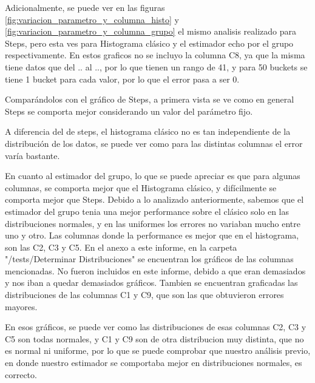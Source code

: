 Adicionalmente, se puede ver en las figuras \ref{fig:variacion_parametro_y_columna_histo} y \ref{fig:variacion_parametro_y_columna_grupo} el mismo analisis realizado para Steps, pero esta ves para Histograma cl\'asico y el estimador echo por el grupo respectivamente. En estos graficos no se incluyo la columna C8, ya que la misma tiene datos que del .. al .., por lo que tienen un rango de 41, y para 50 buckets se tiene 1 bucket para cada valor, por lo que el error pasa a ser 0.

	Compar\'andolos con el gr\'afico de Steps, a primera vista se ve como en general Steps se comporta mejor considerando un valor del par\'ametro fijo. 
	
	A diferencia del de steps, el histograma cl\'asico no es tan independiente de la distribuci\'on de los datos, se puede ver como para las distintas columnas el error var\'ia bastante. 
	
	En cuanto al estimador del grupo, lo que se puede apreciar es que para algunas columnas, se comporta mejor que el Histograma cl\'asico, y dif\'icilmente se comporta mejor que Steps. Debido a lo analizado anteriormente, sabemos que el estimador del grupo tenia una mejor performance sobre el cl\'asico solo en las distribuciones normales, y en las uniformes los errores no variaban mucho entre uno y otro. Las columnas donde la performance es mejor que en el histograma, son las C2, C3 y C5. En el anexo a este informe, en la carpeta "/tests/Determinar Distribuciones" se encuentran los gr\'aficos de las columnas mencionadas. No fueron incluidos en este informe, debido a que eran demasiados y nos iban a quedar demasiados gr\'aficos. Tambien se encuentran graficadas las distribuciones de las columnas C1 y C9, que son las que obtuvieron errores mayores.
	
	En esos gr\'aficos, se puede ver como las distribuciones de esas columnas C2, C3 y C5 son todas normales, y C1 y C9 son de otra distribucion muy distinta, que no es normal ni uniforme, por lo que se puede comprobar que nuestro an\'alisis previo, en donde nuestro estimador se comportaba mejor en distribuciones normales, es correcto.
	